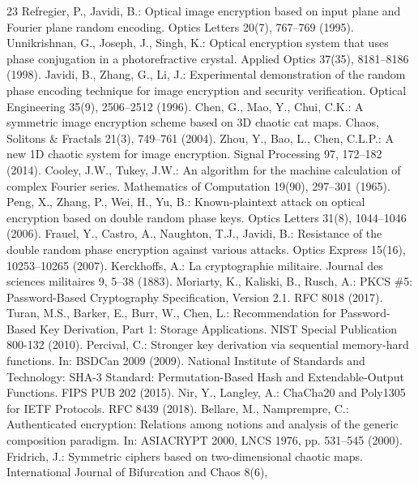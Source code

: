 \documentclass{llncs}
\begin{document}
\begin{thebibliography}{23}
 Refregier, P., Javidi, B.: Optical image encryption
  based on input plane and Fourier plane random encoding. Optics Letters
  20(7), 767--769 (1995).
 Unnikrishnan, G., Joseph, J., Singh, K.: Optical
  encryption system that uses phase conjugation in a photorefractive
  crystal. Applied Optics 37(35), 8181--8186 (1998).
 Javidi, B., Zhang, G., Li, J.: Experimental demonstration of
  the random phase encoding technique for image encryption and security
  verification. Optical Engineering 35(9), 2506--2512 (1996).
 Chen, G., Mao, Y., Chui, C.K.: A symmetric image encryption
  scheme based on 3D chaotic cat maps. Chaos, Solitons \& Fractals 21(3),
  749--761 (2004).
 Zhou, Y., Bao, L., Chen, C.L.P.: A new 1D chaotic system for
  image encryption. Signal Processing 97, 172--182 (2014).
 Cooley, J.W., Tukey, J.W.: An algorithm for the machine
  calculation of complex Fourier series. Mathematics of Computation 19(90),
  297--301 (1965).
 Peng, X., Zhang, P., Wei, H., Yu, B.: Known-plaintext attack
  on optical encryption based on double random phase keys. Optics Letters
  31(8), 1044--1046 (2006).
 Frauel, Y., Castro, A., Naughton, T.J., Javidi, B.:
  Resistance of the double random phase encryption against various attacks.
  Optics Express 15(16), 10253--10265 (2007).
 Kerckhoffs, A.: La cryptographie militaire. Journal des
  sciences militaires 9, 5--38 (1883).
 Moriarty, K., Kaliski, B., Rusch, A.: PKCS \#5: Password-Based
  Cryptography Specification, Version 2.1. RFC 8018 (2017).
 Turan, M.S., Barker, E., Burr, W., Chen, L.:
  Recommendation for Password-Based Key Derivation, Part 1: Storage
  Applications. NIST Special Publication 800-132 (2010).
 Percival, C.: Stronger key derivation via sequential
  memory-hard functions. In: BSDCan 2009 (2009).
 National Institute of Standards and Technology: SHA-3 Standard:
  Permutation-Based Hash and Extendable-Output Functions. FIPS PUB 202 (2015).
 Nir, Y., Langley, A.: ChaCha20 and Poly1305 for IETF
  Protocols. RFC 8439 (2018).
 Bellare, M., Namprempre, C.: Authenticated encryption:
  Relations among notions and analysis of the generic composition paradigm.
  In: ASIACRYPT 2000, LNCS 1976, pp. 531--545 (2000).
 Fridrich, J.: Symmetric ciphers based on two-dimensional
  chaotic maps. International Journal of Bifurcation and Chaos 8(6),

\end{thebibliography}
\end{document}
